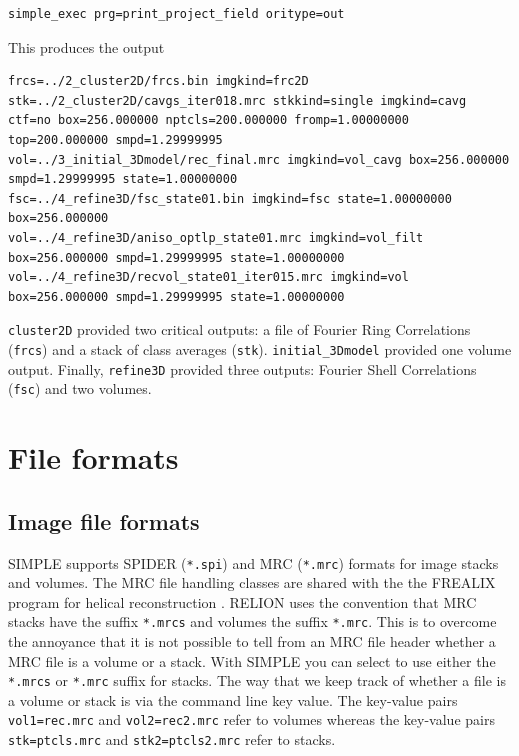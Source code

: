 \documentclass[a4paper,11pt]{article}
\newcommand{\prgname}[1]{\textcolor{NavyBlue}{\texttt{#1}}}
\begin{document}
\begin{Verbatim}[commandchars=+\[\],fontsize=\small,breaklines=true]
simple_exec prg=print_project_field oritype=out
\end{Verbatim}

\noindent{}This produces the output

\begin{Verbatim}[commandchars=+\[\],fontsize=\small,breaklines=true]
frcs=../2_cluster2D/frcs.bin imgkind=frc2D
stk=../2_cluster2D/cavgs_iter018.mrc stkkind=single imgkind=cavg ctf=no box=256.000000 nptcls=200.000000 fromp=1.00000000 top=200.000000 smpd=1.29999995
vol=../3_initial_3Dmodel/rec_final.mrc imgkind=vol_cavg box=256.000000 smpd=1.29999995 state=1.00000000
fsc=../4_refine3D/fsc_state01.bin imgkind=fsc state=1.00000000 box=256.000000
vol=../4_refine3D/aniso_optlp_state01.mrc imgkind=vol_filt box=256.000000 smpd=1.29999995 state=1.00000000
vol=../4_refine3D/recvol_state01_iter015.mrc imgkind=vol box=256.000000 smpd=1.29999995 state=1.00000000
\end{Verbatim}

\noindent{}\prgname{cluster2D} provided two critical outputs: a file of Fourier Ring Correlations (\texttt{frcs}) and a stack of class averages (\texttt{stk}). \prgname{initial\_3Dmodel} provided one volume output. Finally, \prgname{refine3D} provided three outputs: Fourier Shell Correlations (\texttt{fsc}) and two volumes. 

\section{File formats}

\subsection{Image file formats}
SIMPLE supports SPIDER (\texttt{*.spi}) and MRC (\texttt{*.mrc}) formats for image stacks and volumes. The MRC file handling classes are shared with the the FREALIX program for helical reconstruction \citep{Rohou:2014aa}. RELION \citep{Scheres:2012aa} uses the convention that MRC stacks have the suffix \texttt{*.mrcs} and volumes the suffix \texttt{*.mrc}. This is to overcome the annoyance that it is not possible to tell from an MRC file header whether a MRC file is a volume or a stack. With SIMPLE you can select to use either the \texttt{*.mrcs} or \texttt{*.mrc} suffix for stacks. The way that we keep track of whether a file is a volume or stack is via the command line key value. The key-value pairs \texttt{vol1=rec.mrc} and \texttt{vol2=rec2.mrc} refer to volumes whereas the key-value pairs \texttt{stk=ptcls.mrc} and \texttt{stk2=ptcls2.mrc} refer to stacks.
\end{document}
